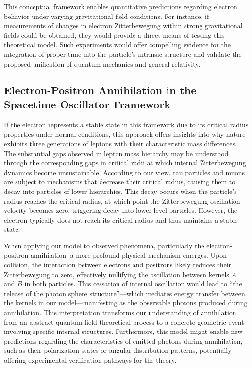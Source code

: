 \documentclass[%
 reprint,
 amsmath,amssymb,
 aps,
]{revtex4-1}
\numberwithin{equation}{section}%
\begin{document}
This conceptual framework enables quantitative predictions regarding electron behavior under varying gravitational field conditions. For instance, if measurements of changes in electron Zitterbewegung within strong gravitational fields could be obtained, they would provide a direct means of testing this theoretical model. Such experiments would offer compelling evidence for the integration of proper time into the particle's intrinsic structure and validate the proposed unification of quantum mechanics and general relativity.

\subsection{Electron-Positron Annihilation in the Spacetime Oscillator Framework}
\label{Electron-Positron}

If the electron represents a stable state in this framework due to its critical radius properties under normal conditions, this approach offers insights into why nature exhibits three generations of leptons with their characteristic mass differences. The substantial gaps observed in lepton mass hierarchy may be understood through the corresponding gaps in critical radii at which internal Zitterbewegung dynamics become unsustainable. According to our view, tau particles and muons are subject to mechanisms that decrease their critical radius, causing them to decay into particles of lower hierarchies. This decay occurs when the particle's radius reaches the critical radius, at which point the Zitterbewegung oscillation velocity becomes zero, triggering decay into lower-level particles. However, the electron typically does not reach its critical radius and thus maintains a stable state. 

When applying our model to observed phenomena, particularly the electron-positron annihilation, a more profound physical mechanism emerges. Upon collision, the interaction between electrons and positrons likely reduces their Zitterbewegung to zero, effectively nullifying the oscillation between kernels $A$ and $B$ in both particles. This cessation of internal oscillation would lead to ``the release of the photon sphere structure''---which mediates energy transfer between the kernels in our model—manifesting as the observable photons produced during annihilation. This interpretation transforms our understanding of annihilation from an abstract quantum field theoretical process to a concrete geometric event involving specific internal structures. Furthermore, this model might enable new predictions regarding the characteristics of emitted photons during annihilation, such as their polarization states or angular distribution patterns, potentially offering experimental verification pathways for the theory.
\end{document}
